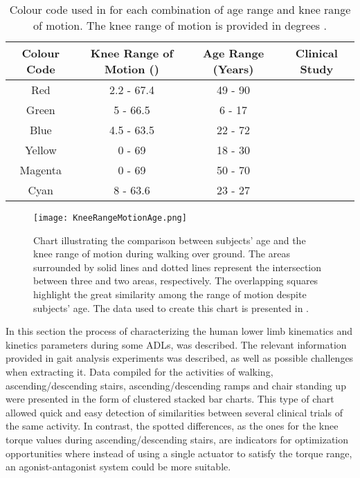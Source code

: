 \begin{table}[htb!]
\caption{Colour code used in  for each combination of age range and knee range of motion. The knee range of motion is provided in degrees \cite{solis2017characterization}.}
\label{tbl:KneeRangeMotionage}
\begin{tabular}{c|c|c|c}
\hline
Colour Code & Knee Range of Motion (\degree{}) & Age Range (Years) & Clinical Study \\
\hline
Red         & 2.2 - 67.4               & 49 - 90           & \cite{rowe2000knee}       \\
Green       & 5 - 66.5                 & 6 - 17            & \cite{bovi2011multiple}        \\
Blue        & 4.5 - 63.5               & 22 - 72           & \cite{bovi2011multiple}           \\
Yellow      & 0 - 69                   & 18 - 30           & \cite{lee2008biomechanics}        \\
Magenta     & 0 - 69                   & 50 - 70           & \cite{lee2008biomechanics}     \\
Cyan        & 8 - 63.6                 & 23 - 27           & \cite{han2011biomechanical}    \\  
\hline
\end{tabular}
\end{table}

\begin{figure}[htb!]
    \centering
    \texttt{[image: KneeRangeMotionAge.png]}
    \caption{Chart illustrating the comparison between subjects' age and the knee range of motion during walking over ground. The areas surrounded by solid lines and dotted lines represent the intersection between three and two areas, respectively. The overlapping squares highlight the great similarity among the range of motion despite subjects' age. The data used to create this chart is presented in  \cite{solis2017characterization}. }
    \label{fig:KneeRangeAge}
\end{figure}

In this section the process of characterizing the human lower limb kinematics and kinetics parameters during some ADLs, was described. The relevant information provided in gait analysis experiments was described, as well as possible challenges when extracting it. Data compiled for the activities of walking, ascending/descending stairs, ascending/descending ramps and chair standing up were presented in the form of clustered stacked bar charts. This type of chart allowed quick and easy detection of similarities between several clinical trials of the same activity. In contrast, the spotted differences, as the ones for the knee torque values during ascending/descending stairs, are indicators for optimization opportunities where instead of using a single actuator to satisfy the torque range, an agonist-antagonist system could be more suitable.


